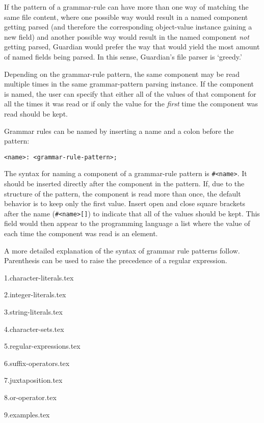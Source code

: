 {	If the pattern of a grammar-rule can have more than one way of matching
	the same file content, where one possible way would result in a named
	component getting parsed (and therefore the corresponding object-value
	instance gaining a new field) and another possible way would result in the
	named component \textit{not} getting parsed, Guardian would prefer the
	way that would yield the most amount of named fields being parsed.
	In this sense, Guardian's file parser is `greedy.'
	
	Depending on the grammar-rule pattern, the same component may be read
	multiple times in the same grammar-pattern parsing instance. If the
	component is named, the user can specify that either all of the values
	of that component for all the times it was read or if
	only the value for the \textit{first} time the component was read
	should be kept.
	
	Grammar rules can be named by inserting a name and a colon before the pattern:
	\begin{lstlisting}[numbers = none, texcl = true, language = MAIA]
<name>: <grammar-rule-pattern>;
	\end{lstlisting}
	
	The syntax for naming a component of a grammar-rule pattern is
	\texttt{\#<name>}.
	It should be inserted directly after the component in the pattern.
	If, due to the structure of the pattern, the component is read more than
	once, the default behavior is to keep only the first value. Insert open
	and close square brackets after the name (\texttt{\#<name>[]}) to indicate
	that all of the values should be kept. This field would then appear to the
	programming language a list where the value of each time the component was
	read is an element.
	
	A more detailed explanation of the syntax of grammar rule patterns follow.
	Parenthesis can be used to raise the precedence of a regular expression.
	
	{1.character-literals.tex}
	
	{2.integer-literals.tex}
	
	{3.string-literals.tex}
	
	{4.character-sets.tex}
	
	{5.regular-expressions.tex}
	
	{6.suffix-operators.tex}
	
	{7.juxtaposition.tex}
	
	{8.or-operator.tex}
	
	{9.examples.tex}
}

















